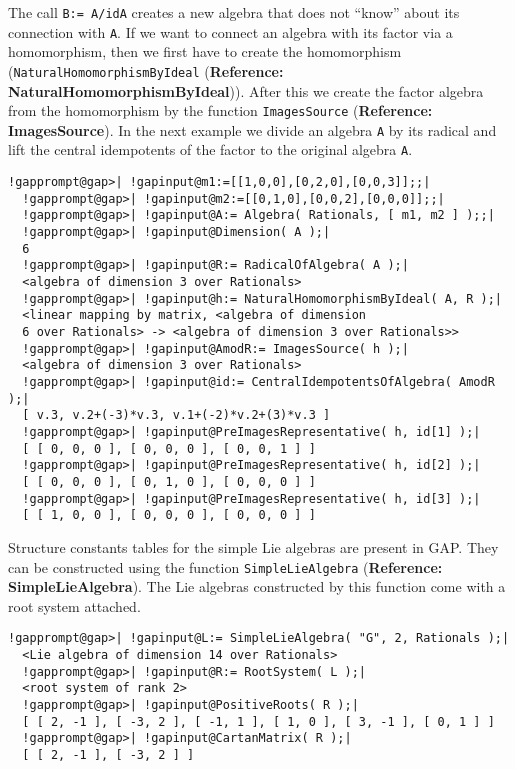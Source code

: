 \documentclass[a4paper,11pt]{report}
\begin{document}
{{ The call \texttt{B:= A/idA} creates a new algebra that does not ``know'' about its connection with \texttt{A}. If we want to connect an algebra with its factor via a homomorphism, then we
first have to create the homomorphism (\texttt{NaturalHomomorphismByIdeal} (\textbf{Reference: NaturalHomomorphismByIdeal})). After this we create the factor algebra from the homomorphism by the
function \texttt{ImagesSource} (\textbf{Reference: ImagesSource}). In the next example we divide an algebra \texttt{A} by its radical and lift the central idempotents of the factor to the original
algebra \texttt{A}. 

 
\begin{Verbatim}[commandchars=!@|,fontsize=\small,frame=single,label=Example]
  !gapprompt@gap>| !gapinput@m1:=[[1,0,0],[0,2,0],[0,0,3]];;|
  !gapprompt@gap>| !gapinput@m2:=[[0,1,0],[0,0,2],[0,0,0]];;|
  !gapprompt@gap>| !gapinput@A:= Algebra( Rationals, [ m1, m2 ] );;|
  !gapprompt@gap>| !gapinput@Dimension( A );|
  6
  !gapprompt@gap>| !gapinput@R:= RadicalOfAlgebra( A );|
  <algebra of dimension 3 over Rationals>
  !gapprompt@gap>| !gapinput@h:= NaturalHomomorphismByIdeal( A, R );|
  <linear mapping by matrix, <algebra of dimension 
  6 over Rationals> -> <algebra of dimension 3 over Rationals>>
  !gapprompt@gap>| !gapinput@AmodR:= ImagesSource( h );|
  <algebra of dimension 3 over Rationals>
  !gapprompt@gap>| !gapinput@id:= CentralIdempotentsOfAlgebra( AmodR );|
  [ v.3, v.2+(-3)*v.3, v.1+(-2)*v.2+(3)*v.3 ]
  !gapprompt@gap>| !gapinput@PreImagesRepresentative( h, id[1] );|
  [ [ 0, 0, 0 ], [ 0, 0, 0 ], [ 0, 0, 1 ] ]
  !gapprompt@gap>| !gapinput@PreImagesRepresentative( h, id[2] );|
  [ [ 0, 0, 0 ], [ 0, 1, 0 ], [ 0, 0, 0 ] ]
  !gapprompt@gap>| !gapinput@PreImagesRepresentative( h, id[3] );|
  [ [ 1, 0, 0 ], [ 0, 0, 0 ], [ 0, 0, 0 ] ]
\end{Verbatim}
 

 Structure constants tables for the simple Lie algebras are present in \textsf{GAP}. They can be constructed using the function \texttt{SimpleLieAlgebra} (\textbf{Reference: SimpleLieAlgebra}). The Lie algebras constructed by this function come with a root system
attached. 

 
\begin{Verbatim}[commandchars=!@|,fontsize=\small,frame=single,label=Example]
  !gapprompt@gap>| !gapinput@L:= SimpleLieAlgebra( "G", 2, Rationals );|
  <Lie algebra of dimension 14 over Rationals>
  !gapprompt@gap>| !gapinput@R:= RootSystem( L );|
  <root system of rank 2>
  !gapprompt@gap>| !gapinput@PositiveRoots( R );|
  [ [ 2, -1 ], [ -3, 2 ], [ -1, 1 ], [ 1, 0 ], [ 3, -1 ], [ 0, 1 ] ]
  !gapprompt@gap>| !gapinput@CartanMatrix( R );|
  [ [ 2, -1 ], [ -3, 2 ] ]
\end{Verbatim}
 

}}
\end{document}
